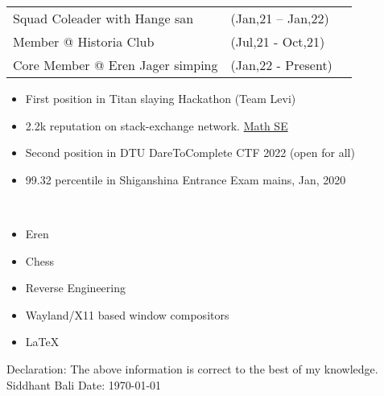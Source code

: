 \documentclass[10pt]{extarticle}
\newcommand{\yourname}{Siddhant Bali}%
\begin{document}
\vspace{0pt}
\begin{contained}
\begin{longtable}{p{}p{}p{}}
    Squad Coleader with Hange san & (Jan,21 – Jan,22)\\
    Member @ Historia Club & (Jul,21 - Oct,21)\\
    Core Member @ Eren Jager simping & (Jan,22 - Present)\\
\end{longtable}
\vspace{0pt}
\end{contained}
\begin{contained}
\vspace{0pt}
\begin{itemize}
    \setlength\itemsep{0.5pt}
    \item First position in Titan slaying Hackathon (Team Levi)
    \item 2.2k reputation on stack-exchange network. \href{https://math.stackexchange.com/users/811225}{\color{red!70} Math SE}
    \item Second position in DTU DareToComplete CTF 2022 (open for all)
    \item 99.32 percentile in Shiganshina Entrance Exam mains, Jan, 2020
\end{itemize}
\vspace{0pt}
\end{contained}
\begin{contained}\\
\begin{itemize}
    \setlength\itemsep{0.5pt}
    \item Eren
    \item Chess
    \item Reverse Engineering
    \item Wayland/X11 based window compositors
    \item \LaTeX
\end{itemize}
\end{contained}
Declaration: The above information is correct to the best of my knowledge.\newline
\yourname\newline
Date: \today
\end{document}
